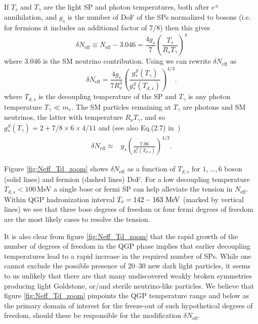 If $T_s$ and $T_\gamma$ are the light SP and photon temperatures, both after $e^\pm$ annihilation, and $g_s$ is the number of DoF of the SPs normalized to bosons (i.e. for fermions it includes an additional factor of $7/8$) then this gives
\begin{equation}\label{Neff1}
\delta N_{\text{eff}}\equiv N_{\text{eff}}-3.046=\frac{4g_s}{7}\left(\frac{T_s}{R_s T_{\gamma}}\right)^4
\end{equation}
where $3.046$ is the SM neutrino contribution. Using  we can rewrite $\delta N_{\text{eff}}$ as
\begin{equation}\label{delta_N}
\delta N_{\text{eff}}=\frac{4g_s}{7R_\nu^4}\left(\frac{g_*^S(T_{\gamma})}{g_*^S(T_{d,s})}\right)^{4/3}.
\end{equation}
where   $T_{d,s}$ is the decoupling temperature of the SP and $T_{\gamma}$ is any photon temperature $T_{\gamma}\ll m_e$. The SM particles remaining at $T_{\gamma}$ are  photons and SM neutrinos, the latter with temperature $R_\nu T_{\gamma}$, and so $g_*^S(T_{\gamma})=2+7/8\times 6\times 4/11$ and (see also Eq.(2.7) in~\cite{Blennow:2012de})
\begin{align}\label{delta_N2}
\delta N_{\text{eff}}\approx&g_s\left(\frac{7.06}{g_*^S(T_{d,s})}\right)^{4/3}.
\end{align}

Figure \ref{fig:Neff_Td_zoom} shows $\delta N_{\text{eff}}$ as a function of $T_{d,s}$ for $1,\dots,6$ boson (solid lines) and fermion (dashed lines) DoF. For a low decoupling temperature $T_{d,s}<100$\,MeV  a single bose or fermi SP  can help alleviate the tension in $N_{\text{eff}}$. Within QGP hadronization interval $T_c=142-163\text{ MeV}$ (marked by vertical lines) we see that three bose degrees of freedom or four fermi degrees of freedom are the most likely cases to resolve the tension. 

It is also clear from  figure \ref{fig:Neff_Td_zoom} that the rapid growth of the number of degrees of freedom in the QGP phase implies that earlier decoupling temperatures lead to a rapid increase in the required number of SPs. While one cannot exclude the possible presence of 20--30 new dark light particles, it seems to us unlikely that there are that many undiscovered weakly broken symmetries producing light Goldstone, or/and sterile neutrino-like particles. We believe that figure \ref{fig:Neff_Td_zoom}  pinpoints the QGP  temperature range and below as the primary domain of interest for the freeze-out of such hypothetical degrees of freedom, should these be responsible for the modification $\delta N_{\text{eff}}$.


